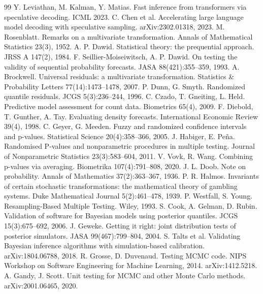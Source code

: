 \documentclass[10pt]{article}
\theoremstyle{remark}
\begin{document}
\begin{thebibliography}{99}\small
{} Y. Leviathan, M. Kalman, Y. Matias. Fast inference from transformers via speculative decoding. ICML 2023.
 C. Chen et al. Accelerating large language model decoding with speculative sampling. arXiv:2302.01318, 2023.
 M. Rosenblatt. Remarks on a multivariate transformation. Annals of Mathematical Statistics 23(3), 1952.
 A. P. Dawid. Statistical theory: the prequential approach. JRSS A 147(2), 1984.
 F. Seillier-Moiseiwitsch, A. P. Dawid. On testing the validity of sequential probability forecasts. JASA 88(421):355--359, 1993.
 A. Brockwell. Universal residuals: a multivariate transformation. Statistics \& Probability Letters 77(14):1473--1478, 2007.
 P. Dunn, G. Smyth. Randomized quantile residuals. JCGS 5(3):236--244, 1996.
 C. Czado, T. Gneiting, L. Held. Predictive model assessment for count data. Biometrics 65(4), 2009.
 F. Diebold, T. Gunther, A. Tay. Evaluating density forecasts. International Economic Review 39(4), 1998.
 C. Geyer, G. Meeden. Fuzzy and randomized confidence intervals and p-values. Statistical Science 20(4):358--366, 2005.
 J. Habiger, E. Pe\~na. Randomised P-values and nonparametric procedures in multiple testing. Journal of Nonparametric Statistics 23(3):583--604, 2011.
 V. Vovk, R. Wang. Combining p-values via averaging. Biometrika 107(4):791--808, 2020.
 J. L. Doob. Note on probability. Annals of Mathematics 37(2):363--367, 1936.
 P. R. Halmos. Invariants of certain stochastic transformations: the mathematical theory of gambling systems. Duke Mathematical Journal 5(2):461--478, 1939.
 P. Westfall, S. Young. Resampling-Based Multiple Testing. Wiley, 1993.
 S. Cook, A. Gelman, D. Rubin. Validation of software for Bayesian models using posterior quantiles. JCGS 15(3):675--692, 2006.
 J. Geweke. Getting it right: joint distribution tests of posterior simulators. JASA 99(467):799--804, 2004.
 S. Talts et al. Validating Bayesian inference algorithms with simulation-based calibration. arXiv:1804.06788, 2018.
 R. Grosse, D. Duvenaud. Testing MCMC code. NIPS Workshop on Software Engineering for Machine Learning, 2014. arXiv:1412.5218.
 A. Gandy, J. Scott. Unit testing for MCMC and other Monte Carlo methods. arXiv:2001.06465, 2020.

\end{thebibliography}
\end{document}
